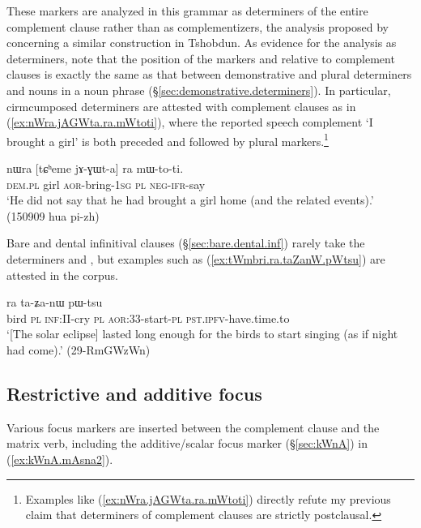 These markers are analyzed in this grammar as determiners of the entire complement clause rather than as complementizers, the analysis proposed by \citet[481]{sun12complementation} concerning a similar construction in Tshobdun. As evidence for the analysis as determiners, note that the position of the markers  and  relative to complement clauses  is exactly the same as that between demonstrative and plural determiners and nouns in a noun phrase (§\ref{sec:demonstrative.determiners}). In particular, cirmcumposed determiners are attested with complement clauses as in (\ref{ex:nWra.jAGWta.ra.mWtoti}), where the reported speech complement  `I brought a girl' is both preceded and followed by plural markers.\footnote{Examples like (\ref{ex:nWra.jAGWta.ra.mWtoti}) directly refute my previous claim \citep[258]{jacques16complementation} that determiners of complement clauses are strictly postclausal. }

\begin{exe}
\ex \label{ex:nWra.jAGWta.ra.mWtoti}
\gll nɯra [tɕʰeme jɤ-ɣɯt-a] ra mɯ-to-ti. \\
\textsc{dem}.\textsc{pl} girl \textsc{aor}-bring-\textsc{1sg} \textsc{pl} \textsc{neg}-\textsc{ifr}-say \\
\glt  `He did not say that he had brought a girl home (and the related events).'  (150909 hua pi-zh)
\end{exe}
 
Bare and dental infinitival clauses (§\ref{sec:bare.dental.inf}) rarely take the determiners  and , but examples such as (\ref{ex:tWmbri.ra.taZanW.pWtsu}) are attested in the corpus.

\begin{exe}
\ex \label{ex:tWmbri.ra.taZanW.pWtsu}
 ra ta-ʑa-nɯ pɯ-tsu \\
bird \textsc{pl} \textsc{inf}:II-cry \textsc{pl} \textsc{aor}:3\fl{}3-start-\textsc{pl} \textsc{pst}.\textsc{ipfv}-have.time.to \\
\glt `[The solar eclipse] lasted long enough for the birds to start singing (as if night had come).' (29-RmGWzWn)
\end{exe}
 
 
\subsection{Restrictive and additive focus} \label{sec:complement.restriction}
Various focus markers are inserted between the complement clause and the matrix verb, including the additive/scalar focus marker  (§\ref{sec:kWnA}) in (\ref{ex:kWnA.mAsna2}).

